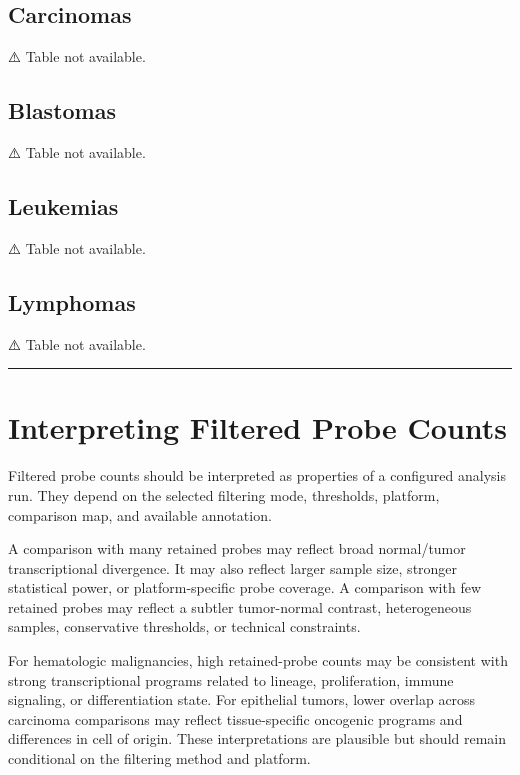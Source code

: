 \documentclass[
  letterpaper,
  DIV=11,
  numbers=noendperiod,
  openany,
  oneside]{scrreprt}
\begin{document}
\subsection{Carcinomas}\label{carcinomas}

⚠️ Table not available.

\subsection{Blastomas}\label{blastomas}

⚠️ Table not available.

\subsection{Leukemias}\label{leukemias}

⚠️ Table not available.

\subsection{Lymphomas}\label{lymphomas}

⚠️ Table not available.

\begin{center}\rule{0.5\linewidth}{0.5pt}\end{center}

\section{Interpreting Filtered Probe
Counts}\label{interpreting-filtered-probe-counts}

Filtered probe counts should be interpreted as properties of a
configured analysis run. They depend on the selected filtering mode,
thresholds, platform, comparison map, and available annotation.

A comparison with many retained probes may reflect broad normal/tumor
transcriptional divergence. It may also reflect larger sample size,
stronger statistical power, or platform-specific probe coverage. A
comparison with few retained probes may reflect a subtler tumor-normal
contrast, heterogeneous samples, conservative thresholds, or technical
constraints.

For hematologic malignancies, high retained-probe counts may be
consistent with strong transcriptional programs related to lineage,
proliferation, immune signaling, or differentiation state. For
epithelial tumors, lower overlap across carcinoma comparisons may
reflect tissue-specific oncogenic programs and differences in cell of
origin. These interpretations are plausible but should remain
conditional on the filtering method and platform.
\end{document}
